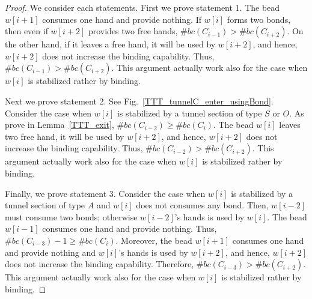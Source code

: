 \begin{proof}

	We consider each statements. First we prove statement 1.
	The bead $w[i+1]$ consumes one hand and provide nothing.
	If $w[i]$ forms two bonds, then even if $w[i+2]$ provides two free hands, $\#bc(C_{i-1}) > \#bc(C_{i+2})$.
	On the other hand, if it leaves a free hand, it will be used by $w[i+2]$, and hence, $w[i+2]$ does not increase the binding capability.
	Thus, $\#bc(C_{i-1}) > \#bc(C_{i+2})$.
	This argument actually work also for the case when $w[i]$ is stabilized rather by binding.
	
	Next we prove statement 2.
	See Fig.~\ref{TTT_tunnelC_enter_usingBond}.
	Consider the case when $w[i]$ is stabilized by a tunnel section of type $S$ or $O$.
	As prove in Lemma~\ref{TTT_exit}, $\#bc(C_{i-2}) \geq \#bc(C_{i})$.%
	The bead $w[i]$ leaves two free hand, it will be used by $w[i+2]$, and hence, $w[i+2]$ does not increase the binding capability.
	Thus, $\#bc(C_{i-2}) > \#bc(C_{i+2})$.
	This argument actually work also for the case when $w[i]$ is stabilized rather by binding.
	
	Finally, we prove statement 3.
	Consider the case when $w[i]$ is stabilized by a tunnel section of type $A$ and $w[i]$ does not consumes any bond.
	Then, $w[i-2]$ must consume two bonds; otherwise $w[i-2]$'s hands is used by $w[i]$.
	The bead $w[i-1]$ consumes one hand and provide nothing.
	Thus,  $\#bc(C_{i-3}) - 1 \geq \#bc(C_{i})$.
	Moreover, the bead $w[i+1]$ consumes one hand and provide nothing and $w[i]$'s hands is used by $w[i+2]$, and hence, $w[i+2]$ does not increase the binding capability.
	Therefore, $\#bc(C_{i-3}) > \#bc(C_{i+2})$.
	This argument actually work also for the case when $w[i]$ is stabilized rather by binding.
\end{proof}

